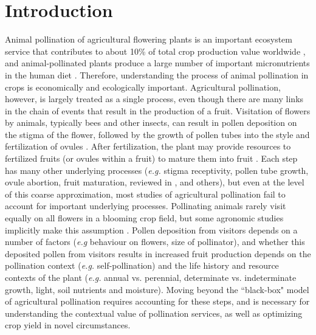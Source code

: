 \documentclass[12pt]{article} %
\begin{document}
\section{Introduction}
Animal pollination of agricultural flowering plants is an important ecosystem service that contributes to about 10\% of total crop production value worldwide \citep{gallai2009}, and animal-pollinated plants produce a large number of important micronutrients in the human diet \citep{eilers2011}.
Therefore, understanding the process of animal pollination in crops is economically and ecologically important. %
Agricultural pollination, however, is largely treated as a single process, even though there are many links in the chain of events that result in the production of a fruit.
Visitation of flowers by animals, typically bees and other insects, can result in pollen deposition on the stigma of the flower, followed by the growth of pollen tubes into the style and fertilization of ovules \citep{erbar2003}. 
After fertilization, the plant may provide resources to fertilized fruits (or ovules within a fruit) to mature them into fruit \citep{goldberg1994}.
Each step has many other underlying processes (\textit{e.g.} stigma receptivity, pollen tube growth, ovule abortion, fruit maturation, reviewed in \citealp{real1983, giovannoni2001, erbar2003, takayama2005}, and others), but even at the level of this coarse approximation, most studies of agricultural pollination fail to account for important underlying processes.
Pollinating animals rarely visit equally on all flowers in a blooming crop field\citep{currie1997, brosi2008, isaacs2010}, but some agronomic studies implicitly make this assumption \citep{phillips1989, bommarco2012, bartomeus2014}. 
Pollen deposition from visitors depends on a number of factors (\textit{e.g} behaviour on flowers, size of pollinator), and whether this deposited pollen from visitors results in increased fruit production depends on the pollination context (\textit{e.g.} self-pollination) and the life history and resource contexts of the plant (\textit{e.g.} annual vs. perennial, determinate vs. indeterminate growth, light, soil nutrients and moisture).
Moving beyond the ``black-box" model of agricultural pollination requires accounting for these steps, and is necessary for understanding the contextual value of pollination services, as well as optimizing crop yield in novel circumstances.
\end{document}
